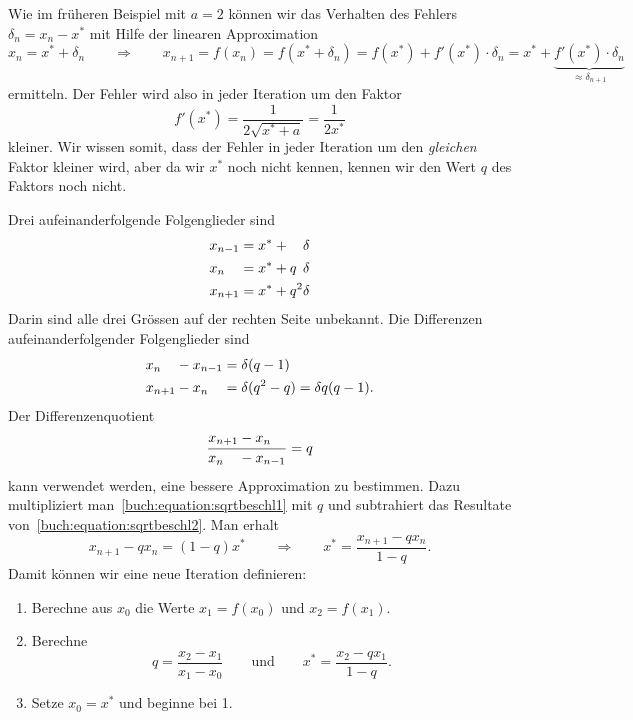 Wie im früheren Beispiel mit $a=2$ können wir das Verhalten des Fehlers
$\delta_n = x_n-x^*$
mit Hilfe der linearen Approximation
%
\[
x_n = x^* + \delta_n
\qquad\Rightarrow\qquad
x_{n+1} = f(x_n) = f(x^* + \delta_n) = f(x^*) + f'(x^*)\cdot \delta_n
=
x^* + \underbrace{f'(x^*)\cdot \delta_n}_{\displaystyle\approx\delta_{n+1}}
\]
ermitteln.
Der Fehler wird also in jeder Iteration um den Faktor
\[
f'(x^*) = \frac1{2\sqrt{x^*+a}}=\frac1{2x^*}
\]
kleiner.
Wir wissen somit, dass der Fehler in jeder Iteration um den
{\em gleichen} Faktor
kleiner wird, aber da wir $x^*$ noch nicht kennen, kennen wir den Wert $q$
des Faktors noch nicht.

Drei aufeinanderfolgende Folgenglieder sind
\begin{align}
x_{n-1}           &= x^* + \phantom{q^2}\delta
\notag
\\
x_{n\phantom{-0}} &= x^* + q^{\phantom{2}}\delta
\label{buch:equation:sqrtbeschl1}
\\
x_{n+1}           &= x^* + q^2\delta
\label{buch:equation:sqrtbeschl2}
\end{align}
Darin sind alle drei Grössen auf der rechten Seite unbekannt.
Die Differenzen aufeinanderfolgender Folgenglieder sind
\begin{align*}
x_{n\phantom{\mathstrut-0}} - x_{n-1} &= \delta(q-1)                  \\
x_{n+1}-x_{n\phantom{\mathstrut -0}}  &= \delta(q^2-q) =\delta q(q-1).
\end{align*}
Der Differenzenquotient
%
\[
\frac{
x_{n+1}-x_{n\phantom{\mathstrut -0}}
}{
x_{n\phantom{\mathstrut-0}} - x_{n-1}
}
=q
\]
kann verwendet werden, eine bessere Approximation zu bestimmen.
Dazu multipliziert man~\eqref{buch:equation:sqrtbeschl1} mit $q$
und subtrahiert das Resultate von~\eqref{buch:equation:sqrtbeschl2}.
Man erhalt
\[
x_{n+1}- qx_n = (1-q) x^*
\qquad
\Rightarrow
\qquad
x^* = \frac{x_{n+1}-qx_n}{1-q}.
\]
Damit können wir eine neue Iteration definieren:
\begin{enumerate}
\item Berechne aus $x_0$ die Werte $x_1=f(x_0)$ und $x_2=f(x_1)$.
\item Berechne
\[
q = \frac{x_2-x_1}{x_1-x_0}
\qquad\text{und}\qquad
x^* = \frac{x_{2}-qx_1}{1-q}.
\]
\item Setze $x_0 = x^*$ und beginne bei 1.
\end{enumerate}

